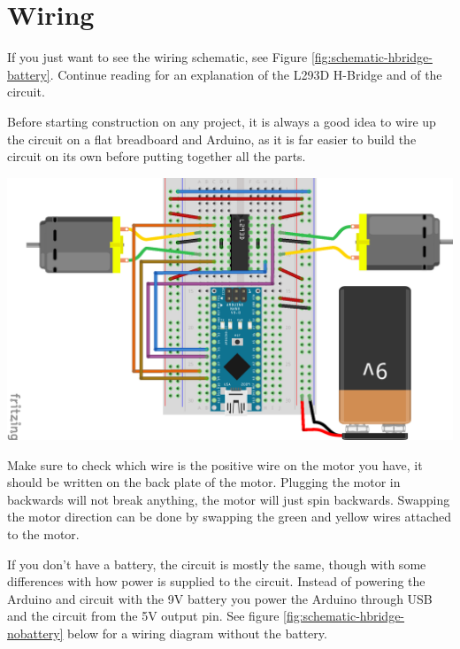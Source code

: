 \documentclass[../TinyBot.tex]{subfiles}
\begin{document}
\section{Wiring} \label{wiring}
If you just want to see the wiring schematic, see Figure \ref{fig:schematic-hbridge-battery}.
Continue reading for an explanation of the L293D H-Bridge and of the circuit. 

\bigskip

Before starting construction on any project, it is always a good idea to wire up the circuit
on a flat breadboard and Arduino, as it is far easier to build the circuit on its own before
putting together all the parts. \\

\begin{center}
    \includegraphics[width=\textwidth]{resources/H-bridge-nano_bb.png}
    \label{fig:schematic-hbridge-battery}
\end{center}

Make sure to check which wire is the positive wire on the motor you have, it should be written
on the back plate of the motor. Plugging the motor in backwards will not break anything,
the motor will just spin backwards. Swapping the motor direction can be done by swapping
the green and yellow wires attached to the motor. \\

\newpage

If you don't have a battery, the circuit is mostly the same, though with some differences
with how power is supplied to the circuit. Instead of powering the Arduino and circuit
with the 9V battery you power the Arduino through USB and the circuit from the 5V output pin.
See figure \ref{fig:schematic-hbridge-nobattery} below for a wiring diagram without the battery.
\end{document}
